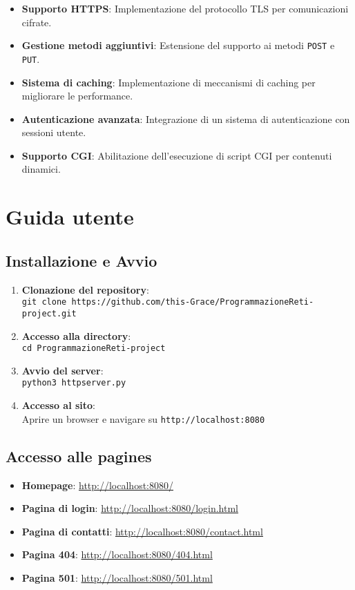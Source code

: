 \documentclass[a4paper,12pt]{report}
\begin{document}
\begin{itemize}
    \item \textbf{Supporto HTTPS}: Implementazione del protocollo TLS per comunicazioni cifrate.
    \item \textbf{Gestione metodi aggiuntivi}: Estensione del supporto ai metodi \texttt{POST} e \texttt{PUT}.
    \item \textbf{Sistema di caching}: Implementazione di meccanismi di caching per migliorare le performance.
    \item \textbf{Autenticazione avanzata}: Integrazione di un sistema di autenticazione con sessioni utente.
    \item \textbf{Supporto CGI}: Abilitazione dell'esecuzione di script CGI per contenuti dinamici.
\end{itemize}

\appendix
\chapter{Guida utente}

\section{Installazione e Avvio}

\begin{enumerate}
    \item \textbf{Clonazione del repository}:\\
    \texttt{git clone https://github.com/this-Grace/ProgrammazioneReti-project.git}

    \item \textbf{Accesso alla directory}:\\
    \texttt{cd ProgrammazioneReti-project}

    \item \textbf{Avvio del server}:\\
    \texttt{python3 httpserver.py}

    \item \textbf{Accesso al sito}:\\
    Aprire un browser e navigare su \texttt{http://localhost:8080}
\end{enumerate}

\section{Accesso alle pagines}

\begin{itemize}
    \item \textbf{Homepage}: \url{http://localhost:8080/}
    \item \textbf{Pagina di login}: \url{http://localhost:8080/login.html}
    \item \textbf{Pagina di contatti}: \url{http://localhost:8080/contact.html}
    \item \textbf{Pagina 404}: \url{http://localhost:8080/404.html}
    \item \textbf{Pagina 501}: \url{http://localhost:8080/501.html}
\end{itemize}
\end{document}
